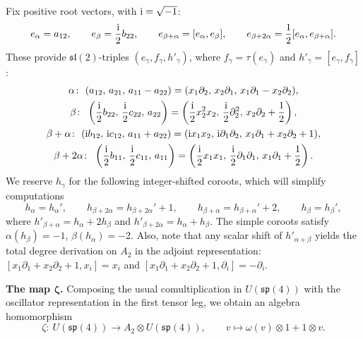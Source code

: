 \documentclass[pdftex]{sigma}
\numberwithin{equation}{section}
\begin{document}
Fix positive root vectors, with
${\rm i}=\sqrt{-1}$:
\begin{align*}
	e_{\alpha} = a_{12}, \qquad e_{\beta} = \frac{{\rm i}}{2}b_{22},\qquad
	e_{\beta+\alpha} =[e_{\alpha},e_\beta],\qquad e_{\beta+2\alpha}=\frac{1}{2}[e_\alpha,e_{\beta+\alpha}].
\end{align*}
These provide $\mathfrak{sl}(2)$-triples $(e_{\gamma},f_{\gamma},h'_{\gamma})$, where $f_{\gamma}=\tau(e_{\gamma})$ and $h'_{\gamma}=[e_{\gamma},f_{\gamma}]$:
\begin{gather*}
		\alpha\colon\ (a_{12},\thinspace a_{21},\thinspace a_{11} - a_{22}) = (x_{1}\partial_{2},\thinspace x_{2}\partial_{1},\thinspace x_{1}\partial_{1}-x_{2}\partial_{2}),\\
		\beta\colon\ \left(\frac{\rm i}{2}b_{22},\thinspace \frac{\rm i}{2}c_{22},\thinspace a_{22}\right) = \left(\frac{\rm i}{2}x^{2}_{2}x_{2},\thinspace \frac{\rm i}{2}\partial^{2}_{2},\thinspace x_{2}\partial_{2} + \frac{1}{2}\right),\\
		\beta + \alpha\colon\ ({\rm i} b_{12},\thinspace {\rm i} c_{12},\thinspace a_{11} + a_{22}) = ({\rm i}x_{1}x_{2},\thinspace {\rm i}\partial_{1}\partial_{2},\thinspace x_{1}\partial_{1} + x_{2}\partial_{2} + 1),\\
		\beta + 2\alpha\colon\ \left(\frac{\rm i}{2}b_{11},\thinspace \frac{\rm i}{2}c_{11},\thinspace a_{11}\right) = \left(\frac{\rm i}{2}x_{1}x_{1},\thinspace \frac{\rm i}{2}\partial_{1}\partial_{1},\thinspace x_{1}\partial_{1} + \frac{1}{2}\right).
\end{gather*}
We reserve $h_\gamma$ for the following integer-shifted coroots,
which will simplify computations
\[%
	h_\alpha = h_\alpha',\qquad h_{\beta+2\alpha}=h_{\beta+2\alpha}'+1,\qquad h_{\beta+\alpha}=h_{\beta+\alpha}'+2,\qquad h_\beta=h_\beta',
\]
where $h'_{\beta+\alpha} = h_{\alpha} + 2h_{\beta}$ and $h'_{\beta+2\alpha} = h_{\alpha} + h_{\beta}$.
The simple coroots satisfy $\alpha(h_{\beta})=-1$, $\beta(h_{\alpha})=-2$.
Also, note that any scalar shift of $h'_{\alpha+\beta}$ yields the total degree derivation on $A_{2}$ in the adjoint representation:
$[x_{1}\partial_{1} + x_{2}\partial_{2} + 1, x_i]=x_i$ and $[x_{1}\partial_{1} + x_{2}\partial_{2} + 1, \partial_i]=-\partial_i$.


{\bf The map $\boldsymbol{\zeta}$.}
Composing the usual comultiplication in $U(\mathfrak{sp}(4))$ with the oscillator representation in the first tensor leg, we obtain an algebra homomorphism
\begin{equation}\label{eq:Homomorphism-sp4toA}
	\zeta\colon\ U(\mathfrak{sp}(4)) \rightarrow A_{2}\otimes U(\mathfrak{sp}(4)),\qquad v\mapsto \omega(v)\otimes 1+1\otimes v.
\end{equation}
\end{document}
